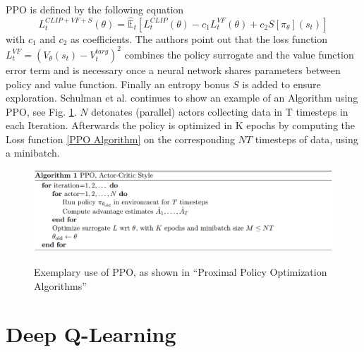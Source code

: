 PPO is defined by the following equation
\begin{equation}\label{PPO Algorithm}
    L_{t}^{CLIP+VF+S}(\theta) = \hat{\mathbb{E}}_{t}[L_{t}^{CLIP}(\theta) - c_{1}L_{t}^{VF}(\theta) + c_{2}S[\pi_{\theta}](s_{t})]
\end{equation}
with $c_{1}$ and $c_{2}$ as coefficients. The authors point out that the loss function \\
$L_{t}^{VF} = (V_{\theta}(s_{t})-V_{t}^{targ})^2$
combines the policy surrogate and the value function error term and is
necessary once a neural network shares parameters between policy and value function.
Finally an entropy bonus $S$ is added to ensure exploration.
Schulman et al. continues to show an example of an Algorithm using PPO, see Fig. \ref{fig:ppo_algo_code}.
$N$ detonates (parallel) actors collecting data in T timesteps in each Iteration.
Afterwards the policy is optimized in K epochs by computing the Loss function \eqref{PPO Algorithm} on the
corresponding $NT$ timesteps of data, using a minibatch.
\begin{figure}[hpbt]
    \centering
    \includegraphics[width=1\textwidth]{pictures/ppo_algo_code.png}\\
    \caption[Exemplary Use Of PPO]{Exemplary use of PPO, as shown in ``Proximal Policy Optimization Algorithms''\cite{scwo17}}\label{fig:ppo_algo_code}
\end{figure}

\section{Deep Q-Learning}